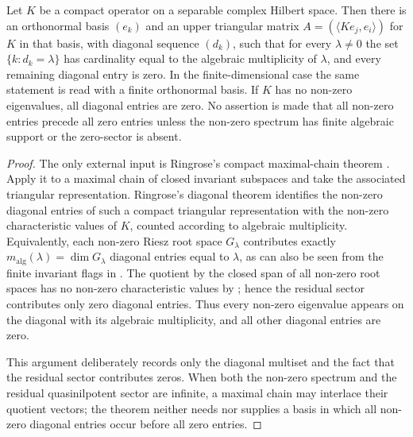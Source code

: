 \begin{lemma}
  \label{lem:compact-prescribed-ringrose-triangularization}
  Let \(K\) be a compact operator on a separable complex Hilbert space.
  Then there is an orthonormal basis \((e_k)\) and an upper triangular matrix
  \(A=(\langle Ke_j,e_i\rangle)\) for \(K\) in that basis, with diagonal
  sequence \((d_k)\), such that for every \(\lambda\ne0\) the set
  \(\{k:d_k=\lambda\}\) has cardinality equal to the algebraic multiplicity
  of \(\lambda\), and every remaining diagonal entry is zero. In the
  finite-dimensional case the same statement is read with a finite
  orthonormal basis. If \(K\) has no non-zero eigenvalues, all diagonal entries
  are zero.  No assertion is made that all non-zero entries precede all zero
  entries unless the non-zero spectrum has finite algebraic support or the
  zero-sector is absent.
\end{lemma}

\begin{proof}
  The only external input is Ringrose's compact maximal-chain theorem
  \cite[Chapter~1, Theorem~3, pp.~6--8]{Ringrose1971CompactNonSelfAdjoint}.
  Apply it to a maximal chain of closed invariant subspaces and take the
  associated triangular representation. Ringrose's diagonal theorem identifies
  the non-zero diagonal entries of such a compact triangular representation
  with the non-zero characteristic values of \(K\), counted according to
  algebraic multiplicity. Equivalently, each non-zero Riesz root space
  \(G_\lambda\) contributes exactly
  \(m_{\mathrm{alg}}(\lambda)=\dim G_\lambda\) diagonal entries equal to
  \(\lambda\), as can also be seen from the finite invariant flags in
  . The quotient by the closed span of
  all non-zero root spaces has no non-zero characteristic values by
  ; hence the residual sector
  contributes only zero diagonal entries. Thus every non-zero eigenvalue
  appears on the diagonal with its algebraic multiplicity, and all other
  diagonal entries are zero.

  This argument deliberately records only the diagonal multiset and the fact
  that the residual sector contributes zeros.  When both the non-zero spectrum
  and the residual quasinilpotent sector are infinite, a maximal chain may
  interlace their quotient vectors; the theorem neither needs nor supplies a
  basis in which all non-zero diagonal entries occur before all zero entries.
\end{proof}

